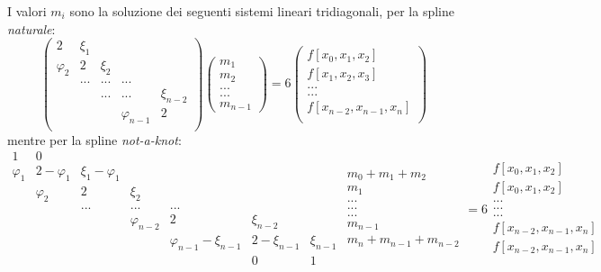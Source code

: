 I valori $m_i$ sono la soluzione dei seguenti sistemi lineari tridiagonali,
per la spline \textit{naturale}:
\[
	\begin{pmatrix}
		2 		& \xi_1 	& 			& 		& 	\\
		\varphi_2 	& 2			& \xi_2	& 		& 	\\
				& ...			& ...			& ... 	& 	\\
				& 			& ...			& ... 	& \xi_{n-2}	\\
				& 			& 			& \varphi_{n-1} 	& 2	\\
	\end{pmatrix}
	\begin{pmatrix}
		m_1 \\
		m_2 \\
		... \\
		... \\
		m_{n-1}
	\end{pmatrix}
	= 6
	\begin{pmatrix}
		f[x_0, x_1, x_2] \\
		f[x_1, x_2, x_3] \\
		... \\
		... \\
		f[x_{n-2}, x_{n-1}, x_n] \\
	\end{pmatrix}
\]
mentre per la spline \textit{not-a-knot}:
\[
	\begin{smallmatrix}
		1 & 0 & & & & & \\
		\varphi_1 & 2-\varphi_1 & \xi_1 - \varphi_1 & & & & \\
		 & \varphi_2 & 2 & \xi_2 & & & \\
		 & & ... & ... & ... & & \\
		 & & & \varphi_{n-2} & 2 & \xi_{n-2} & \\
		 & & & &  \varphi_{n-1} - \xi_{n-1} & 2-\xi_{n-1} & \xi_{n-1} \\
		 & & & & & 0 & 1 \\
	\end{smallmatrix}
	\begin{smallmatrix}
		m_0+m_1+m_2 \\
		m_1 \\
		... \\
		... \\
		... \\
		m_{n-1}\\
		m_n+m_{n-1}+m_{n-2} \\		
	\end{smallmatrix}
	= 6
	\begin{smallmatrix}
		f[x_0, x_1, x_2] \\
		f[x_0, x_1, x_2] \\
		... \\
		... \\
		... \\
		f[x_{n-2}, x_{n-1}, x_n] \\
		f[x_{n-2}, x_{n-1}, x_n] \\
	\end{smallmatrix}
\]

